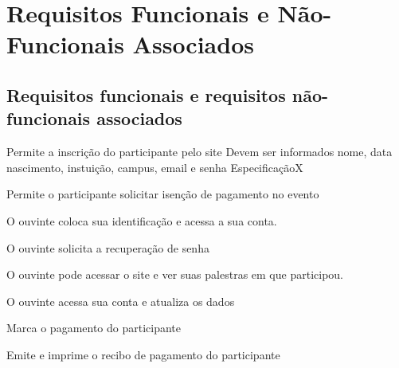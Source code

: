 \documentclass[12pt,a4paper]{article}
\begin{document}
        \clearpage
        \section{Requisitos Funcionais e Não-Funcionais Associados}
        
        	\subsection{Requisitos funcionais e requisitos não-funcionais associados}
        

		\setcounter{NumberReqF}{0}
		\setcounter{NumberReqNF}{0}
        	
        	{Permite a inscrição do participante pelo site}
        	{%
        	  {Devem ser informados nome, data nascimento, instuição, campus, email e senha}
        	  {Especificação}{X}{}%
        	}
        	
        	{Permite o participante solicitar isenção de pagamento no evento}
        	{%
        	}
        	
        	
        	
        	{O ouvinte coloca sua identificação e acessa a sua conta.}
        	{%
        	
        	}
			
									
        	{O ouvinte solicita a recuperação de senha}
        	{%
        	
        	}
			
        	{O ouvinte pode acessar o site e ver suas palestras em que participou.}
        	{%
        	
        	}
			
        	{O ouvinte acessa sua conta e atualiza os dados}
        	{%
        	
        	}
			
        	{Marca o pagamento do participante}
        	{%
        	
        	}
			
        	{Emite e imprime o recibo de pagamento do participante}
        	{%
        	
        	}
			
\end{document}
